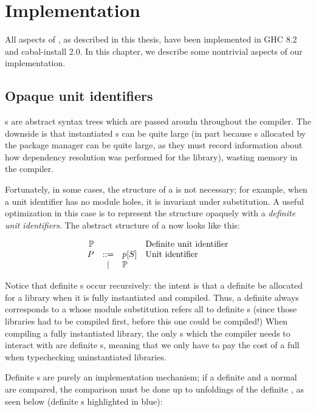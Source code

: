 \chapter{Implementation}

All aspects of \Backpack{}, as described in this thesis,
have been implemented in GHC 8.2 and cabal-install 2.0.  In this
chapter, we describe some nontrivial aspects of our implementation.

\section{Opaque unit identifiers}

\Uid{}s are abstract syntax trees which are passed aroudn throughout
the compiler.  The downside is that instantiated \uid{}s
can be quite large (in part because \cid{}s allocated by the
package manager can be quite large, as they must record information
about how dependency resolution was performed for the library),
wasting memory in the compiler.

Fortunately, in some cases, the structure of a \uid{} is not necessary;
for example, when a unit identifier has no module holes, it is
invariant under substitution.  A useful optimization in this case
is to represent the structure opaquely with a \emph{definite unit
identifiers}.  The abstract structure of a \uid{} now looks like this:

\[
\begin{array}{rcll}
  \mathbb{P} &&& \text{Definite \uid{}} \\
  \UP &::=& \icid{\Up}{S} & \text{\Uid} \\
      & | & \mathbb{P} \\
\end{array}
\]

\noindent
Notice that definite \uid{}s occur recursively: the intent is that a
definite \uid{} be allocated for a library when it is fully instantiated
and compiled.  Thus, a definite \uid{} always corresponds to a \uid{}
whose module substitution refers all to definite \uid{}s (since those
libraries had to be compiled first, before this one could be compiled!)
When compiling a fully instantiated library, the only \uid{}s which the
compiler needs to interact with are definite \uid{}s, meaning that we
only have to pay the cost of a full \uid{} when typechecking uninstantiated
libraries.

Definite \uid{}s are purely an implementation mechanism; if a definite
\uid{} and a normal \uid{} are compared, the comparison must be done
up to unfoldings of the definite \uid{}, as seen below (definite \uid{}s
highlighted in blue):

